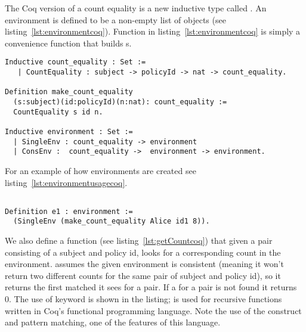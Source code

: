 The Coq version of a count equality is a new inductive type called . An environment is defined to be a non-empty list of  objects (see listing~\ref{lst:environmentcoq}). Function  in listing~\ref{lst:environmentcoq} is simply a convenience function that builds s. 

\begin{minipage}[c]{0.95\textwidth}
\begin{lstlisting}
Inductive count_equality : Set := 
   | CountEquality : subject -> policyId -> nat -> count_equality.

Definition make_count_equality
  (s:subject)(id:policyId)(n:nat): count_equality :=
  CountEquality s id n.
  
Inductive environment : Set := 
  | SingleEnv : count_equality -> environment
  | ConsEnv :  count_equality ->  environment -> environment.

\end{lstlisting}
\end{minipage}

For an example of how environments are created see listing~\ref{lst:environmentusagecoq}.

\begin{lstlisting}

Definition e1 : environment := 
  (SingleEnv (make_count_equality Alice id1 8)).

\end{lstlisting}
  

We also define a  function (see listing~\ref{lst:getCountcoq}) that given a pair consisting of a subject and policy id, looks for a corresponding count in the environment.  assumes the given environment is consistent (meaning it won't return two different counts for the same pair of subject and policy id), so it returns the first matched  it sees for a  pair. If a  for a  pair is not found it returns 0. The use of keyword  is shown in the listing;  is used for recursive functions written in Coq's functional programming language. Note the use of the  construct and pattern matching, one of the features of this language. 


